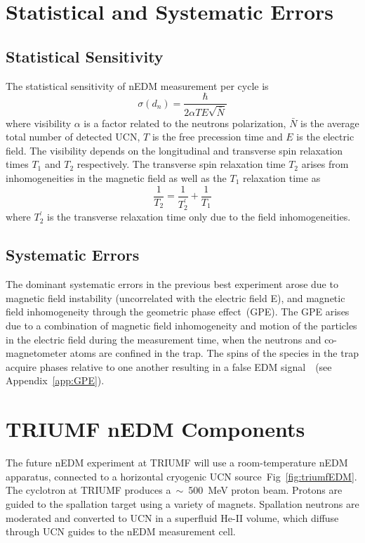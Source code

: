 \section{Statistical and Systematic Errors}
\subsection{Statistical Sensitivity}
The statistical sensitivity of nEDM measurement per cycle is
\begin{equation}
  \label{eqn:dnsensitivity}
\sigma(d_n) = \frac{\hbar}{2 \alpha T E \sqrt{\bar{N}}}
\end{equation}
where visibility $\alpha$ is a factor related to the neutrons
polarization, $\bar{N}$ is the average total number of detected UCN,
$T$ is the free precession time and $E$ is the electric field. The
visibility depends on the longitudinal and transverse spin relaxation
times $T_1$ and $T_2$ respectively. The transverse spin relaxation
time $T_2$ arises from inhomogeneities in the magnetic field as well
as the $T_1$ relaxation time as
\begin{equation}
\frac{1}{T_2} = \frac{1}{T_2^{\prime}}+\frac{1}{T_1}
\end{equation}
where $T_2^{\prime}$ is the transverse relaxation time only
due to the field inhomogeneities.

\subsection{Systematic Errors}
The dominant systematic errors in the previous best experiment arose
due to magnetic field instability (uncorrelated with the electric
field E), and magnetic field inhomogeneity through the geometric phase
effect~(GPE). The GPE arises due to a combination of magnetic field
inhomogeneity and motion of the particles in the electric field during
the measurement time, when the neutrons and co-magnetometer atoms are
confined in the trap. The spins of the species in the trap acquire
phases relative to one another resulting in a false EDM
signal~\cite{pendlebury2004}~(see Appendix~\ref{app:GPE}).




\section{TRIUMF nEDM Components}
The future nEDM experiment at TRIUMF will use a room-temperature nEDM
apparatus, connected to a horizontal cryogenic UCN
source~Fig~\ref{fig:triumfEDM}. 
The cyclotron at TRIUMF produces a~$\sim$~500~MeV proton beam. Protons
are guided to the spallation target using a variety of
magnets. Spallation neutrons are moderated and converted to UCN in a
superfluid He-II volume, which diffuse through UCN guides to the nEDM
measurement cell.

